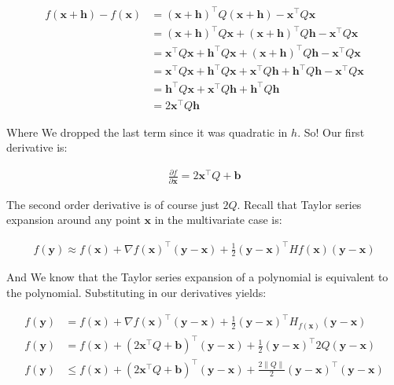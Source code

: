 \documentclass{article}
\begin{document}
		\begin{align}
			f(\mathbf{x+h}) - f(\mathbf{x}) &= (\mathbf{x+h})^\top Q (\mathbf{x+h}) - \mathbf{x}^\top Q \mathbf{x}\\
			&= (\mathbf{x+h})^\top Q \mathbf{x} + (\mathbf{x+h})^\top Q \mathbf{h} - \mathbf{x}^\top Q \mathbf{x}\\
			&= \mathbf{x}^\top Q \mathbf{x} + \mathbf{h}^\top Q \mathbf{x}  + (\mathbf{x+h})^\top Q \mathbf{h} - \mathbf{x}^\top Q \mathbf{x}\\
			&= \mathbf{x}^\top Q \mathbf{x} + \mathbf{h}^\top Q \mathbf{x}  + \mathbf{x}^\top Q \mathbf{h} + \mathbf{h}^\top Q \mathbf{h} - \mathbf{x}^\top Q \mathbf{x}\\
			&=  \mathbf{h}^\top Q \mathbf{x}  + \mathbf{x}^\top Q \mathbf{h} + \mathbf{h}^\top Q \mathbf{h} \\
			&= 2  \mathbf{x}^\top Q \mathbf{h}
		\end{align}
		
		Where We dropped the last term since it was quadratic in $h$. So! Our first derivative is:
		
		\begin{align}
			\frac{\partial f}{\partial \mathbf{x}} = 2  \mathbf{x}^\top Q + \mathbf{b}
		\end{align}
		
		The second order derivative is of course just $2Q$. Recall that Taylor series expansion around any point $\mathbf{x}$ in the multivariate case is:
		
		\begin{align}
			f(\mathbf{y}) \approx f(\mathbf{x}) + \nabla f(\mathbf{x})^\top (\mathbf{y-x}) + \frac{1}{2} (\mathbf{y-x})^\top Hf(\mathbf{x}) (\mathbf{y-x})
		\end{align}
		
		And We know that the Taylor series expansion of a polynomial is equivalent to the polynomial. Substituting in our derivatives yields:
		
		\begin{align}
			f(\mathbf{y}) &= f(\mathbf{x}) + \nabla f(\mathbf{x})^\top (\mathbf{y-x}) + \frac{1}{2} (\mathbf{y-x})^\top H_{f(\mathbf{x})} (\mathbf{y-x})\\
			f(\mathbf{y}) &= f(\mathbf{x}) + ( 2  \mathbf{x}^\top Q + \mathbf{b})^\top (\mathbf{y-x}) + \frac{1}{2} (\mathbf{y-x})^\top 2Q (\mathbf{y-x})\\
			f(\mathbf{y}) &\le f(\mathbf{x}) + ( 2  \mathbf{x}^\top Q + \mathbf{b})^\top (\mathbf{y-x}) + \frac{2\|Q\|}{2}(\mathbf{y-x})^\top  (\mathbf{y-x})
		\end{align}
		
\end{document}
